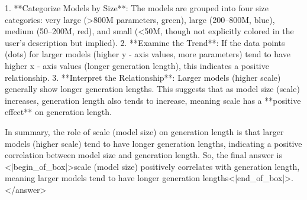 1. **Categorize Models by Size**: The models are grouped into four size categories: very large (>800M parameters, green), large (200–800M, blue), medium (50–200M, red), and small (<50M, though not explicitly colored in the user’s description but implied).  
2. **Examine the Trend**: If the data points (dots) for larger models (higher y - axis values, more parameters) tend to have higher x - axis values (longer generation length), this indicates a positive relationship.  
3. **Interpret the Relationship**: Larger models (higher scale) generally show longer generation lengths. This suggests that as model size (scale) increases, generation length also tends to increase, meaning scale has a **positive effect** on generation length.  

In summary, the role of scale (model size) on generation length is that larger models (higher scale) tend to have longer generation lengths, indicating a positive correlation between model size and generation length.  
So, the final answer is <|begin_of_box|>scale (model size) positively correlates with generation length, meaning larger models tend to have longer generation lengths<|end_of_box|>.</answer>